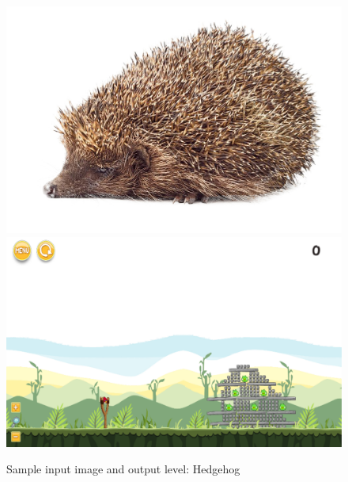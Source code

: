 \documentclass{dalthesis}
\begin{document}
\begin{figure}
	\caption{Sample input image and output level: Hedgehog}
  \includegraphics[width=\textwidth,height=\textheight,keepaspectratio]{levels/pictures/animals/hedgehog.jpg}
  \includegraphics[width=\textwidth,height=\textheight,keepaspectratio]{levels/screenshots/animals/hedgehog.png}
\end{figure}
\end{document}
